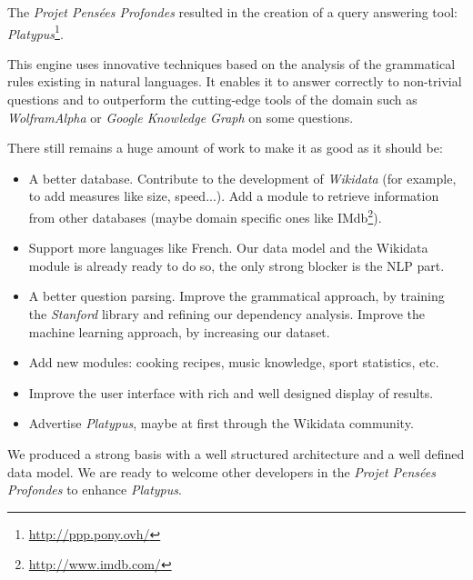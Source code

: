 The \emph{Projet Pensées Profondes} resulted in the creation of a query answering tool: \emph{Platypus}\footnote{\url{http://ppp.pony.ovh/}}.

This engine uses innovative techniques based on the analysis of the grammatical rules existing in natural languages. It enables it to answer correctly to non-trivial questions and to outperform the cutting-edge tools of the domain such as \emph{WolframAlpha} or \emph{Google Knowledge Graph} on some questions.

There still remains a huge amount of work to make it as good as it should be:
\begin{itemize}
    \item A better database. Contribute to the development of \emph{Wikidata} (for example, to add measures like size, speed...). Add a module to retrieve information from other databases (maybe domain specific ones like IMdb\footnote{\url{http://www.imdb.com/}}).
    \item Support more languages like French. Our data model and the Wikidata module is already ready to do so, the only strong blocker is the NLP part.
    \item A better question parsing. Improve the grammatical approach, by training the \emph{Stanford} library and refining our dependency analysis. Improve the machine learning approach, by increasing our dataset.
    \item Add new modules: cooking recipes, music knowledge, sport statistics, etc.
    \item Improve the user interface with rich and well designed display of results.
    \item Advertise \emph{Platypus}, maybe at first through the Wikidata community.
\end{itemize}

We produced a strong basis with a well structured architecture and a well defined data model. We are ready to welcome other developers in the \emph{Projet Pensées Profondes} to enhance \emph{Platypus}.
